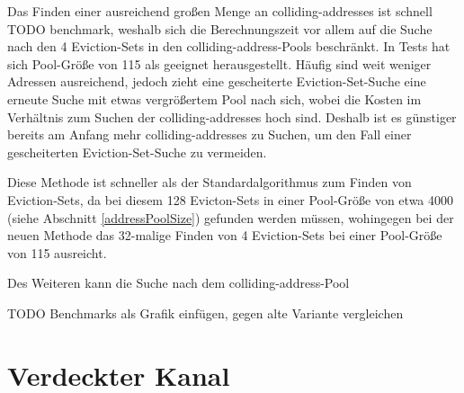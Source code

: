 Das Finden einer ausreichend großen Menge an colliding-addresses ist schnell TODO benchmark, weshalb sich die Berechnungszeit vor allem auf die Suche nach den 4 Eviction-Sets in den colliding-address-Pools beschränkt.
In Tests hat sich Pool-Größe von 115 als geeignet herausgestellt.
Häufig sind weit weniger Adressen ausreichend, jedoch zieht eine gescheiterte Eviction-Set-Suche eine erneute Suche mit etwas vergrößertem Pool nach sich, wobei die Kosten im Verhältnis zum Suchen der colliding-addresses hoch sind.
Deshalb ist es günstiger bereits am Anfang mehr colliding-addresses zu Suchen, um den Fall einer gescheiterten Eviction-Set-Suche zu vermeiden.

Diese Methode ist schneller als der Standardalgorithmus zum Finden von Eviction-Sets, da bei diesem 128 Evicton-Sets in einer Pool-Größe von etwa 4000 (siehe Abschnitt \ref{addressPoolSize}) gefunden werden müssen, wohingegen bei der neuen Methode das 32-malige Finden von 4 Eviction-Sets bei einer Pool-Größe von 115 ausreicht.

Des Weiteren kann die Suche nach dem colliding-address-Pool

TODO Benchmarks als Grafik einfügen, gegen alte Variante vergleichen








\section{Verdeckter Kanal}

